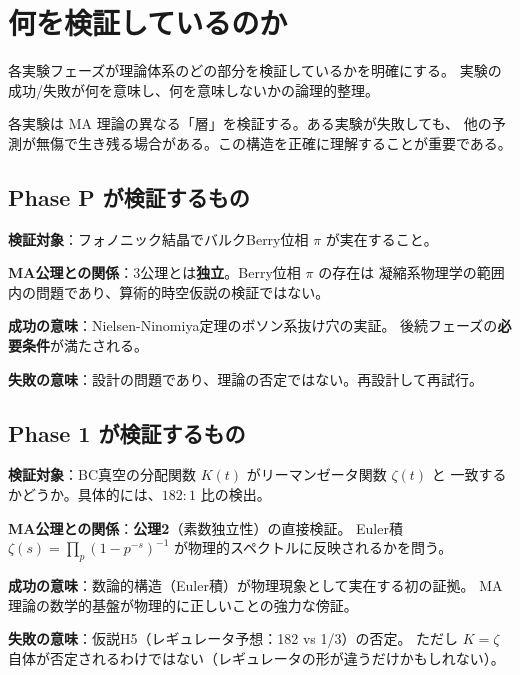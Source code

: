 \chapter{何を検証しているのか}
\label{ch:what-we-test}

\begin{keyresult}[本章の主題]
各実験フェーズが理論体系のどの部分を検証しているかを明確にする。
実験の成功/失敗が何を意味し、何を意味しないかの論理的整理。
\end{keyresult}

各実験は MA 理論の異なる「層」を検証する。ある実験が失敗しても、
他の予測が無傷で生き残る場合がある。この構造を正確に理解することが重要である。

\section{Phase P が検証するもの}
\label{sec:16.1}

\begin{experimentbox}
\textbf{検証対象}：フォノニック結晶でバルクBerry位相 $\pi$ が実在すること。

\medskip
\textbf{MA公理との関係}：3公理とは\textbf{独立}。Berry位相 $\pi$ の存在は
凝縮系物理学の範囲内の問題であり、算術的時空仮説の検証ではない。

\medskip
\textbf{成功の意味}：Nielsen-Ninomiya定理のボソン系抜け穴の実証。
後続フェーズの\textbf{必要条件}が満たされる。

\medskip
\textbf{失敗の意味}：設計の問題であり、理論の否定ではない。再設計して再試行。
\end{experimentbox}

\section{Phase 1 が検証するもの}
\label{sec:16.2}

\begin{experimentbox}
\textbf{検証対象}：BC真空の分配関数 $K(t)$ がリーマンゼータ関数 $\zeta(t)$ と
一致するかどうか。具体的には、$182:1$ 比の検出。

\medskip
\textbf{MA公理との関係}：\textbf{公理2}（素数独立性）の直接検証。
Euler積 $\zeta(s) = \prod_p (1-p^{-s})^{-1}$ が物理的スペクトルに反映されるかを問う。

\medskip
\textbf{成功の意味}：数論的構造（Euler積）が物理現象として実在する初の証拠。
MA理論の数学的基盤が物理的に正しいことの強力な傍証。

\medskip
\textbf{失敗の意味}：仮説H5（レギュレータ予想：182 vs 1/3）の否定。
ただし $K = \zeta$ 自体が否定されるわけではない（レギュレータの形が違うだけかもしれない）。
\end{experimentbox}

